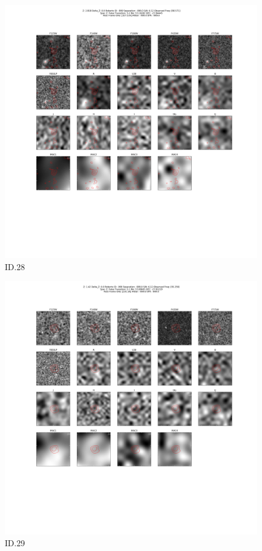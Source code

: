 \begin{figure}[tbp]
\centering \includegraphics[width=120mm]{Matched/ASPECS_Cutout_28.png}
\caption{ID.28}
\label{fig:Match_Three}
\end{figure}

\begin{figure}[tbp]
\centering \includegraphics[width=120mm]{Matched/ASPECS_Cutout_29.png}
\caption{ID.29}
\label{fig:Match_Three}
\end{figure}

